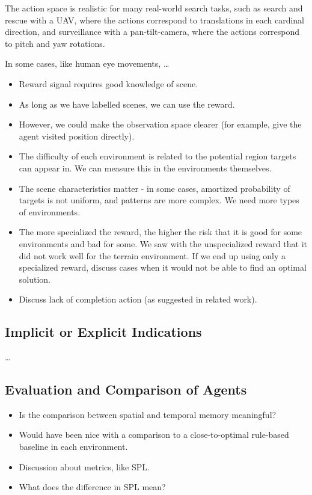 The action space is realistic for many real-world search tasks,
such as search and rescue with a UAV, where the actions correspond to translations in each cardinal direction,
and surveillance with a pan-tilt-camera, where the actions correspond to pitch and yaw rotations.

In some cases, like human eye movements, \dots


\begin{itemize}
    \item Reward signal requires good knowledge of scene.
    \item As long as we have labelled scenes, we can use the reward.
    \item However, we could make the observation space clearer (for example, give the agent visited position directly).
    \item The difficulty of each environment is related to the potential region targets can appear in. We can measure this in the environments themselves.
    \item The scene characteristics matter - in some cases, amortized probability of targets is not uniform, and patterns are more complex. We need more types of environments.
    \item The more specialized the reward, the higher the risk that it is good for some environments and bad for some. We saw with the unspecialized reward that it did not work well for the terrain environment. If we end up using only a specialized reward, discuss cases when it would not be able to find an optimal solution.
    \item Discuss lack of completion action (as suggested in related work).

\end{itemize}


\subsection{Implicit or Explicit Indications}

\dots


\subsection{Evaluation and Comparison of Agents}

\begin{itemize}
    \item Is the comparison between spatial and temporal memory meaningful?
    \item Would have been nice with a comparison to a close-to-optimal rule-based baseline in each environment.
    \item Discussion about metrics, like SPL.
    \item What does the difference in SPL mean?
\end{itemize}

